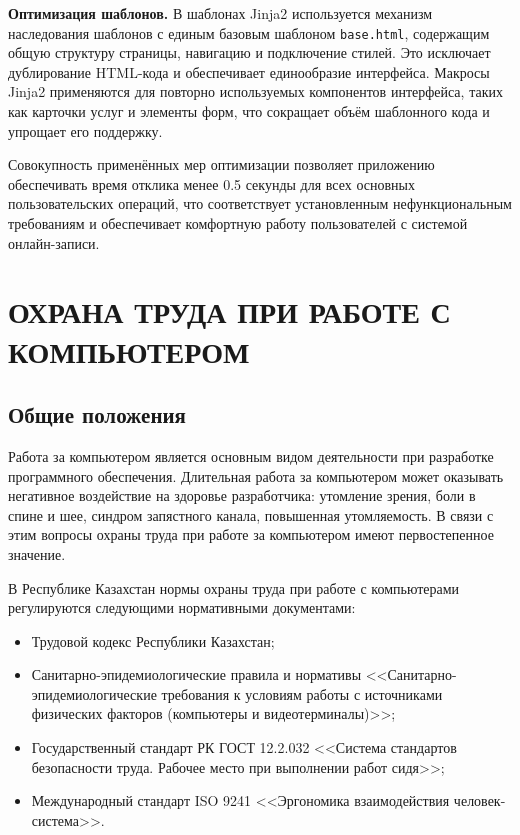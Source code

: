 \documentclass[14pt,a4paper,oneside]{extarticle}
\begin{document}
\textbf{Оптимизация шаблонов.} В шаблонах Jinja2 используется механизм наследования шаблонов с единым базовым шаблоном \texttt{base.html}, содержащим общую структуру страницы, навигацию и подключение стилей. Это исключает дублирование HTML-кода и обеспечивает единообразие интерфейса. Макросы Jinja2 применяются для повторно используемых компонентов интерфейса, таких как карточки услуг и элементы форм, что сокращает объём шаблонного кода и упрощает его поддержку.

Совокупность применённых мер оптимизации позволяет приложению обеспечивать время отклика менее 0.5 секунды для всех основных пользовательских операций, что соответствует установленным нефункциональным требованиям и обеспечивает комфортную работу пользователей с системой онлайн-записи.


\newpage
\section{ОХРАНА ТРУДА ПРИ РАБОТЕ С КОМПЬЮТЕРОМ}

\subsection{Общие положения}

Работа за компьютером является основным видом деятельности при разработке программного обеспечения. Длительная работа за компьютером может оказывать негативное воздействие на здоровье разработчика: утомление зрения, боли в спине и шее, синдром запястного канала, повышенная утомляемость. В связи с этим вопросы охраны труда при работе за компьютером имеют первостепенное значение.

В Республике Казахстан нормы охраны труда при работе с компьютерами регулируются следующими нормативными документами:
\begin{itemize}[leftmargin=2cm]
    \item Трудовой кодекс Республики Казахстан;
    \item Санитарно-эпидемиологические правила и нормативы <<Санитарно-эпидемиологические требования к условиям работы с источниками физических факторов (компьютеры и видеотерминалы)>>;
    \item Государственный стандарт РК ГОСТ 12.2.032 <<Система стандартов безопасности труда. Рабочее место при выполнении работ сидя>>;
    \item Международный стандарт ISO 9241 <<Эргономика взаимодействия человек-система>>.
\end{itemize}
\end{document}

